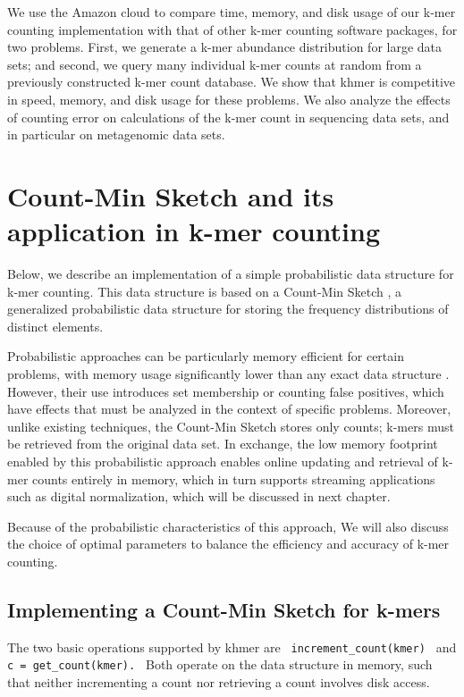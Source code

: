 We use the Amazon cloud to compare time, memory, and disk usage of our
k-mer counting implementation with that of other k-mer counting software packages, 
for two problems. First, we generate a k-mer abundance
distribution for large data sets; and second, we query many individual
k-mer counts at random from a previously constructed k-mer count
database.  We show that khmer is competitive in speed, memory, and
disk usage for these problems.  We also analyze the effects of
counting error on calculations of the k-mer count in sequencing data
sets, and in particular on metagenomic data sets. 


\section{Count-Min Sketch and its application in k-mer counting}

Below, we describe an implementation of a simple probabilistic data
structure for k-mer counting. This data structure is based on a
Count-Min Sketch \cite{Cormode2005}, a generalized probabilistic data structure for
storing the frequency distributions of distinct elements. 

Probabilistic approaches can be particularly memory efficient for
certain problems, with memory usage significantly lower than any exact
data structure \cite{Pell2012}.  However, their use introduces set
membership or counting false positives, which have effects that must
be analyzed in the context of specific problems.  Moreover, unlike
existing techniques, the Count-Min Sketch stores only counts; k-mers
must be retrieved from the original data set.  In exchange, the low
memory footprint enabled by this probabilistic approach enables online
updating and retrieval of k-mer counts entirely in memory, which in
turn supports streaming applications such as digital normalization, which will
be discussed in next chapter.

Because of the 
probabilistic characteristics of this approach, We will also discuss
the choice of optimal parameters to balance the efficiency and accuracy of k-mer 
counting.



\subsection{Implementing a Count-Min Sketch for k-mers}

The two basic operations supported by khmer are {\tt
  increment\_count(kmer) } and {\tt c = get\_count(kmer). } Both
operate on the data structure in memory, such that neither
incrementing a count nor retrieving a count involves disk access.

